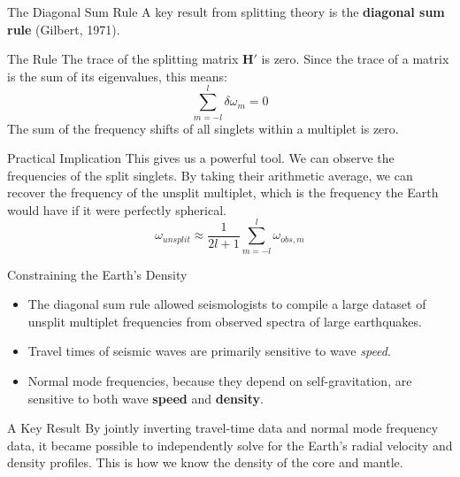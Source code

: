 \documentclass{beamer}
\begin{document}

\begin{frame}{The Diagonal Sum Rule}
    A key result from splitting theory is the \textbf{diagonal sum rule} (Gilbert, 1971).
    \begin{block}{The Rule}
        The trace of the splitting matrix $\mathbf{H}'$ is zero. Since the trace of a matrix is the sum of its eigenvalues, this means:
        $$ \sum_{m=-l}^{l} \delta\omega_m = 0 $$
        The sum of the frequency shifts of all singlets within a multiplet is zero.
    \end{block}
    \pause
    \begin{alertblock}{Practical Implication}
        This gives us a powerful tool. We can observe the frequencies of the split singlets. By taking their arithmetic average, we can recover the frequency of the unsplit multiplet, which is the frequency the Earth would have if it were perfectly spherical.
        $$ \omega_{unsplit} \approx \frac{1}{2l+1} \sum_{m=-l}^{l} \omega_{obs, m} $$
    \end{alertblock}
\end{frame}

\begin{frame}{Constraining the Earth's Density}
    \begin{itemize}
        \item The diagonal sum rule allowed seismologists to compile a large dataset of unsplit multiplet frequencies from observed spectra of large earthquakes.
        \pause
        \item Travel times of seismic waves are primarily sensitive to wave \textit{speed}.
        \pause
        \item Normal mode frequencies, because they depend on self-gravitation, are sensitive to both wave \textbf{speed} and \textbf{density}.
    \end{itemize}
    \pause
    \begin{alertblock}{A Key Result}
        By jointly inverting travel-time data and normal mode frequency data, it became possible to independently solve for the Earth's radial velocity and density profiles. This is how we know the density of the core and mantle.
    \end{alertblock}
\end{frame}
\end{document}
